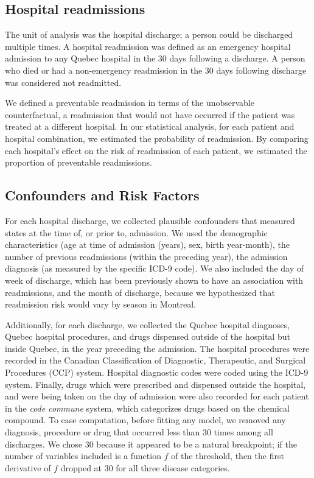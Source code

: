 \documentclass[]{article}\usepackage[]{graphicx}\usepackage[]{color}
\begin{document}
\subsection{Hospital readmissions}
The unit of analysis was the hospital discharge; a person could be discharged multiple times. A hospital readmission was defined as an emergency hospital admission to any Quebec hospital in the 30 days following a discharge.  A person who died or had a non-emergency readmission in the 30 days following discharge was considered not readmitted.

We defined a preventable readmission in terms of the unobservable counterfactual, a readmission that would not have occurred if the patient was treated at a different hospital. In our statistical analysis, for each patient and hospital combination, we estimated the probability of readmission. By comparing each hospital's effect on the risk of readmission of each patient, we estimated the proportion of preventable readmissions.

\subsection{Confounders and Risk Factors}
For each hospital discharge, we collected plausible confounders that measured states at the time of, or prior to, admission. We used the demographic characteristics (age at time of admission (years), sex, birth year-month), the number of previous readmissions (within the preceding year), the admission diagnosis (as measured by the specific ICD-9 code). We also included the day of week of discharge, which has been previously shown to have an association with readmissions\supercite{van_walraven_risk_2002}, and the month of discharge, because we hypothesized that readmission risk would vary by season in Montreal.

Additionally, for each discharge, we collected the Quebec hospital diagnoses, Quebec hospital procedures, and drugs dispensed outside of the hospital but inside Quebec, in the year preceding the admission. The hospital procedures were recorded in the Canadian Classification of Diagnostic, Therapeutic, and Surgical Procedures (CCP) system. Hospital diagnostic codes were coded using the ICD-9 system. Finally, drugs which were prescribed and dispensed outside the hospital, and were being taken on the day of admission were also recorded for each patient in the \emph{code commune} system, which categorizes drugs based on the chemical compound. To ease computation, before fitting any model, we removed any diagnosis, procedure or drug that occurred less than 30 times among all discharges. We chose 30 because it appeared to be a natural breakpoint; if the number of variables included is a function $f$ of the threshold, then the first derivative of $f$ dropped at 30 for all three disease categories.
\end{document}
